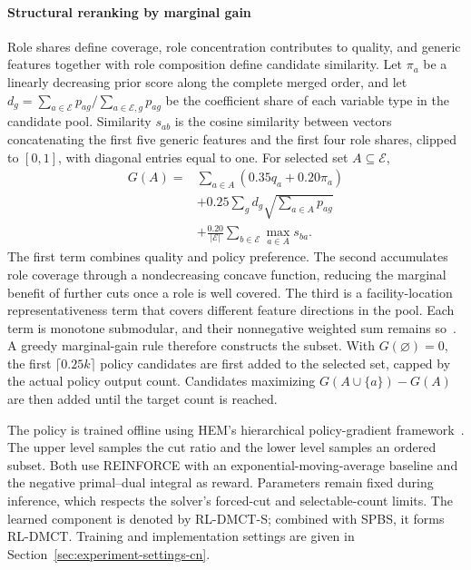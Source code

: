 \documentclass[final,5p,times,twocolumn]{elsarticle}
\begin{document}
\paragraph{Structural reranking by marginal gain}
Role shares define coverage, role concentration contributes to quality, and generic features together with role composition define candidate similarity. Let $\pi_a$ be a linearly decreasing prior score along the complete merged order, and let $d_g=\sum_{a\in\mathcal E}p_{ag}/\sum_{a\in\mathcal E,g}p_{ag}$ be the coefficient share of each variable type in the candidate pool. Similarity $s_{ab}$ is the cosine similarity between vectors concatenating the first five generic features and the first four role shares, clipped to $[0,1]$, with diagonal entries equal to one. For selected set $A\subseteq\mathcal E$,
\begin{equation}
\begin{aligned}
G(A)={}&\sum_{a\in A}(0.35q_a+0.20\pi_a)\\
&+0.25\sum_gd_g\sqrt{\sum_{a\in A}p_{ag}}\\
&+\frac{0.20}{|\mathcal E|}\sum_{b\in\mathcal E}\max_{a\in A}s_{ba}.
\end{aligned}
\label{eq:cut-rerank-cn}
\end{equation}
The first term combines quality and policy preference. The second accumulates role coverage through a nondecreasing concave function, reducing the marginal benefit of further cuts once a role is well covered. The third is a facility-location representativeness term that covers different feature directions in the pool. Each term is monotone submodular, and their nonnegative weighted sum remains so~\citep{krause2014submodular}. A greedy marginal-gain rule therefore constructs the subset. With $G(\varnothing)=0$, the first $\lceil0.25k\rceil$ policy candidates are first added to the selected set, capped by the actual policy output count. Candidates maximizing $G(A\cup\{a\})-G(A)$ are then added until the target count is reached.

The policy is trained offline using HEM's hierarchical policy-gradient framework~\citep{wang2023hem}. The upper level samples the cut ratio and the lower level samples an ordered subset. Both use REINFORCE with an exponential-moving-average baseline and the negative primal--dual integral as reward. Parameters remain fixed during inference, which respects the solver's forced-cut and selectable-count limits. The learned component is denoted by RL-DMCT-S; combined with SPBS, it forms RL-DMCT. Training and implementation settings are given in Section~\ref{sec:experiment-settings-cn}.
\end{document}
